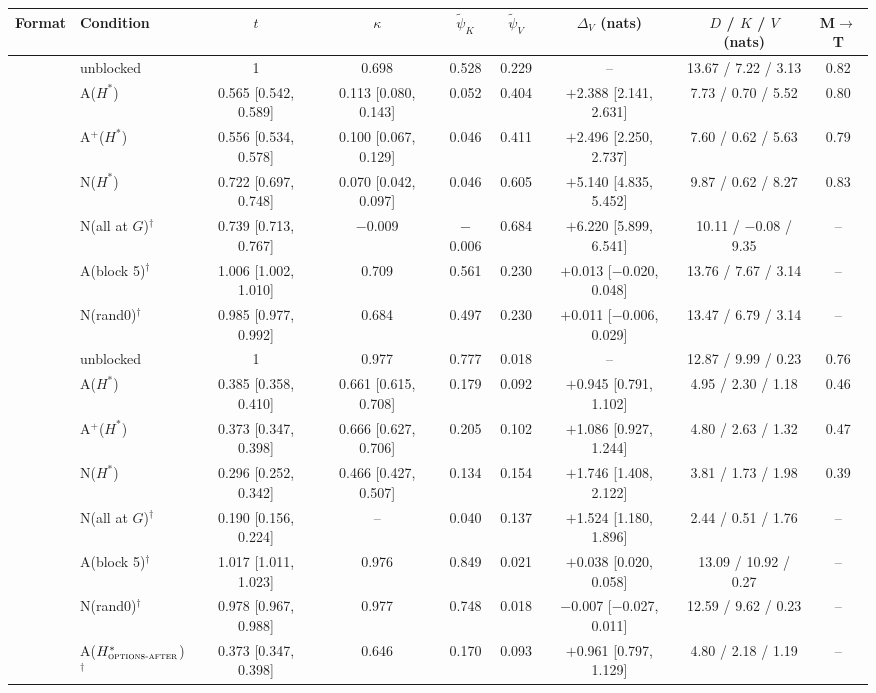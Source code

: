\begin{tabular}{@{}llccccccc@{}}
\toprule
Format & Condition & $t$ & $\kappa$ & $\tilde\psi_K$ & $\tilde\psi_V$ & $\Delta_V$ (nats) & $D$ / $K$ / $V$ (nats) & M$\to$T \\
\midrule
\fmtOpt{} & unblocked & 1 & 0.698 & 0.528 & 0.229 & -- & 13.67 / 7.22 / 3.13 & 0.82 \\
 & A($H^*$) & 0.565 [0.542, 0.589] & 0.113 [0.080, 0.143] & 0.052 & 0.404 & $+$2.388 [2.141, 2.631] & 7.73 / 0.70 / 5.52 & 0.80 \\
 & A$^+$($H^*$) & 0.556 [0.534, 0.578] & 0.100 [0.067, 0.129] & 0.046 & 0.411 & $+$2.496 [2.250, 2.737] & 7.60 / 0.62 / 5.63 & 0.79 \\
 & N($H^*$) & 0.722 [0.697, 0.748] & 0.070 [0.042, 0.097] & 0.046 & 0.605 & $+$5.140 [4.835, 5.452] & 9.87 / 0.62 / 8.27 & 0.83 \\
 & N(all at $G$)$^\dagger$ & 0.739 [0.713, 0.767] & $-$0.009 & $-$0.006 & 0.684 & $+$6.220 [5.899, 6.541] & 10.11 / $-$0.08 / 9.35 & -- \\
 & A(block 5)$^\dagger$ & 1.006 [1.002, 1.010] & 0.709 & 0.561 & 0.230 & $+$0.013 [$-$0.020, 0.048] & 13.76 / 7.67 / 3.14 & -- \\
 & N(rand0)$^\dagger$ & 0.985 [0.977, 0.992] & 0.684 & 0.497 & 0.230 & $+$0.011 [$-$0.006, 0.029] & 13.47 / 6.79 / 3.14 & -- \\
\midrule
\fmtLetter{} & unblocked & 1 & 0.977 & 0.777 & 0.018 & -- & 12.87 / 9.99 / 0.23 & 0.76 \\
 & A($H^*$) & 0.385 [0.358, 0.410] & 0.661 [0.615, 0.708] & 0.179 & 0.092 & $+$0.945 [0.791, 1.102] & 4.95 / 2.30 / 1.18 & 0.46 \\
 & A$^+$($H^*$) & 0.373 [0.347, 0.398] & 0.666 [0.627, 0.706] & 0.205 & 0.102 & $+$1.086 [0.927, 1.244] & 4.80 / 2.63 / 1.32 & 0.47 \\
 & N($H^*$) & 0.296 [0.252, 0.342] & 0.466 [0.427, 0.507] & 0.134 & 0.154 & $+$1.746 [1.408, 2.122] & 3.81 / 1.73 / 1.98 & 0.39 \\
 & N(all at $G$)$^\dagger$ & 0.190 [0.156, 0.224] & -- & 0.040 & 0.137 & $+$1.524 [1.180, 1.896] & 2.44 / 0.51 / 1.76 & -- \\
 & A(block 5)$^\dagger$ & 1.017 [1.011, 1.023] & 0.976 & 0.849 & 0.021 & $+$0.038 [0.020, 0.058] & 13.09 / 10.92 / 0.27 & -- \\
 & N(rand0)$^\dagger$ & 0.978 [0.967, 0.988] & 0.977 & 0.748 & 0.018 & $-$0.007 [$-$0.027, 0.011] & 12.59 / 9.62 / 0.23 & -- \\
 & A($H^*_{\text{\textsc{options-after}{}}}$)$^\dagger$ & 0.373 [0.347, 0.398] & 0.646 & 0.170 & 0.093 & $+$0.961 [0.797, 1.129] & 4.80 / 2.18 / 1.19 & -- \\

\end{tabular}
